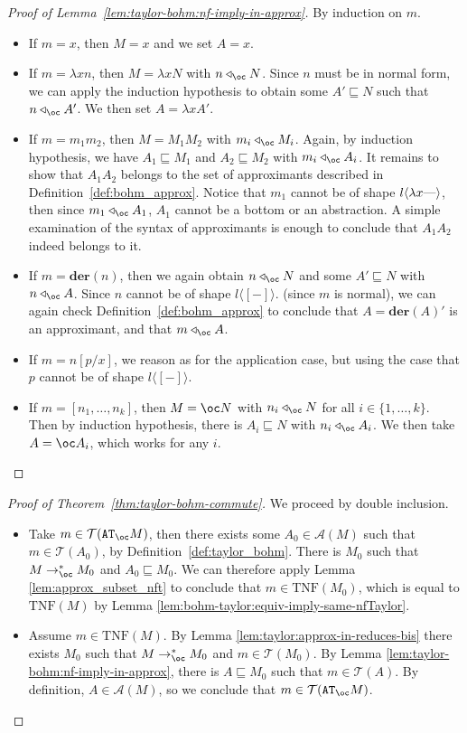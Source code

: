 \documentclass[10pt,a4paper]{article}
\newcommand{\<}{\langle}
\renewcommand{\>}{\rangle}
\newcommand{\der}[1]{\ensuremath{\mathbf{der}(#1)}}
\newcommand{\todbf}{\to_{\oc}} %
\newcommand{\es}[2]{[#1/#2]}
\newcommand{\app}{\triangleleft_\oc} %
\newcommand{\mcal}[1]{\ensuremath{\mathcal{#1}}}
\newcommand{\setApprox}{\mcal{A}}
\newcommand{\setapprox}{\setApprox}
\newcommand{\taylor}[1]{\ensuremath{\mathcal{T}(#1)}}
\newcommand{\taylornf}[1]{\ensuremath{\text{TNF}(#1)}}
\newcommand{\btb}{\ensuremath{{\tt{AT}_\oc}}}
\newcommand{\smaller}{\ensuremath{\sqsubseteq}}
\newcommand{\nativeemdash}{\ifmmode\text{\textemdash}\else\textemdash\fi}
\begin{document}
\begin{proof}[Proof of Lemma~\ref{lem:taylor-bohm:nf-imply-in-approx}]
	By induction on $m$.
	\begin{itemize}
		\item If $m=x$, then $M=x$ and we set $A=x$.
		\item If $m=\lambda xn$, then $M=\lambda xN$ with $n\app N$.
			Since $n$ must be in normal form, we can apply the
			induction hypothesis to obtain some $A'\smaller N$
			such that $n\app A'$. We then set $A=\lambda xA'$.
		\item If $m=m_1m_2$, then $M=M_1M_2$ with $m_i\app M_i$. Again,
			by induction hypothesis, we have $A_1\smaller M_1$
			and $A_2\smaller M_2$ with $m_i\app A_i$. It remains
			to show that $A_1A_2$ belongs to the set of approximants
			described in Definition~\ref{def:bohm_approx}. Notice
			that $m_1$ cannot be of shape $l\<\lambda x\nativeemdash{}\>$, then since $m_1\app
			A_1$, $A_1$ cannot be a bottom or an abstraction. A
			simple examination of the syntax of approximants is
			enough to conclude that $A_1A_2$ indeed belongs to it.
		\item If $m=\der n$, then we again obtain $n\app N$ and some
			$A'\smaller N$ with $n\app A$. Since $n$ cannot be of
			shape $l\<[-]\>$.
			 (since $m$ is normal), we can again check
			Definition~\ref{def:bohm_approx} to conclude that $A=\der
			A'$ is an approximant, and that $m\app A$.
		\item If $m=n\es px$, we reason as for the application case, but
			using the case that $p$ cannot be of shape $l\<[-]\>$. 
		\item If $m=[n_1,\dots ,n_k]$, then $M=\oc N$ with $n_i\app N$ for
			all $i\in\{1,\dots ,k\}$. Then by induction hypothesis, there
			is $A_i\smaller N$ with $n_i\app A_i$. We then take
			$A=\oc A_i$, which works for any $i$.\qedhere
	\end{itemize}
\end{proof}


\begin{proof}[Proof of Theorem~\ref{thm:taylor-bohm-commute}]
We proceed by double inclusion.
\begin{itemize}
	\item Take $m \in \taylor{ \btb{M}}$, then there exists some $A_0\in\setapprox(M)$ such that
		$m \in \taylor{ A_0}$, by Definition~\ref{def:taylor_bohm}.
		There is $M_0$ such that $M \todbf^* M_0$ and $A_0 \smaller M_0$.
		We can therefore apply Lemma
		\ref{lem:approx_subset_nft} to conclude
		that $m \in \taylornf {M_0}$, which is
		equal to $\taylornf M$ by Lemma \ref{lem:bohm-taylor:equiv-imply-same-nfTaylor}.
	\item Assume $m \in \taylornf M$. By Lemma
		\ref{lem:taylor:approx-in-reduces-bis} there exists $M_0$ such
		that
		$M \todbf^* M_0$ and $m \in \taylor{M_0}$. By Lemma
		\ref{lem:taylor-bohm:nf-imply-in-approx}, there is $A\smaller
		M_0$ such that
		$m \in \taylor{ A}$. By definition, $A\in\setApprox(M)$, so we conclude that
		$m \in \taylor{ \btb{M}}$. \qedhere
\end{itemize}
\end{proof}
\end{document}
